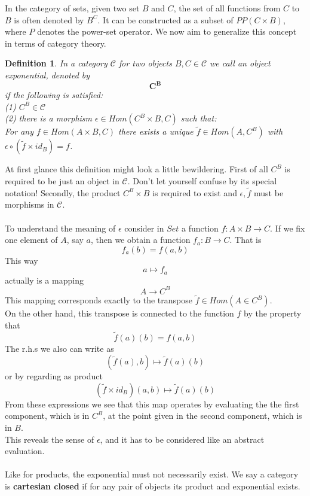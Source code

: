 \documentclass[17pt]{extarticle}
\newtheorem*{definition*}{Definition}
\begin{document}
In the category of sets, given two set $B$ and $C$, the set of all functions from $C$ to $B$ is often denoted by $B^C$. It can be constructed as a subset of $PP(C\times B)$, where $P$ denotes the power-set operator. We now aim to generalize this concept in terms of category theory.\\

\begin{definition*}
In a category $\mathcal{C}$ for two objects $B, C\in\mathcal{C}$ we call an object exponential, denoted by
	$$\mathbf{C^B}$$
	if the following is satisfied:\\
	(1) $C^B\in\mathcal{C}$\\
	(2) there is a morphism $\epsilon\in Hom(C^B\times B, C)$ such that:\\
	For any $f\in Hom(A\times B, C)$ there exists a unique $\tilde{f}\in Hom(A, C^B)$ with $\epsilon\circ(\tilde{f}\times id_B)=f$.
\end{definition*}
\leavevmode\newline
At first glance this definition might look a little bewildering. First of all $C^B$ is required to be just an object in $\mathcal{C}$. Don't let yourself confuse by its special notation! Secondly, the product $C^B\times B$ is required to exist and $\epsilon, \tilde{f}$ must be morphisms in $\mathcal{C}$.\\ \\
To understand the meaning of $\epsilon$ consider in $Set$ a function $f:A\times B\rightarrow C$. If we fix one element of $A$, say $a$, then we obtain a function $f_a:B\rightarrow C$. That is
$$f_a(b)=f(a,b)$$
This way 
$$a\mapsto f_a$$
actually is a mapping 
$$A\rightarrow C^B$$
This mapping corresponds exactly to the transpose $\tilde{f}\in Hom(A\in C^B)$.\\
On the other hand, this transpose is connected to the function $f$ by the property that 
$$\tilde{f}(a)(b)=f(a,b)$$
The r.h.s we also can write as
$$\left(\tilde{f}(a),b\right)\mapsto \tilde{f}(a)(b)$$
or by regarding as product
$$(\tilde{f}\times id_B)(a,b)\mapsto \tilde{f}(a)(b)$$
From these expressions we see that this map operates by evaluating the the first component,
which is in $C^B$, at the point given in the second component, which is in $B$.\\
This reveals the sense of $\epsilon$, and it has to be considered like an abstract evaluation.\\ \\
Like for products, the exponential must not necessarily exist. We say a category is \textbf{cartesian closed} if for any pair of objects its product and exponential exists.
\end{document}
